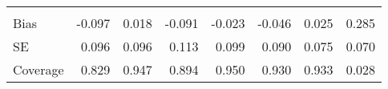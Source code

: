 \begin{appendix}
\begin{refsection}
\begin{table}[p]
\begin{tabular}{lddddddd}
\addlinespace[0.3em]
\\
\hspace{1em}Bias & -0.097 & 0.018 & -0.091 & -0.023 & -0.046 & 0.025 & 0.285\\
\hspace{1em}SE & 0.096 & 0.096 & 0.113 & 0.099 & 0.090 & 0.075 & 0.070\\
\hspace{1em}Coverage & 0.829 & 0.947 & 0.894 & 0.950 & 0.930 & 0.933 & 0.028\\
\bottomrule
\end{tabular}
\end{table}
\newpage
\clearpage
 \printbibliography[heading=subbibliography]
\end{refsection}
\end{appendix}


